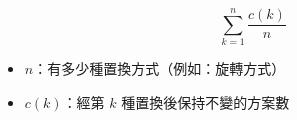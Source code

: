$$
\sum\limits_{k=1}^{n} \frac{c(k)}{n}
$$

\begin{itemize}
    \item $n$：有多少種置換方式（例如：旋轉方式）
    \item $c(k)$：經第 $k$ 種置換後保持不變的方案數
\end{itemize}